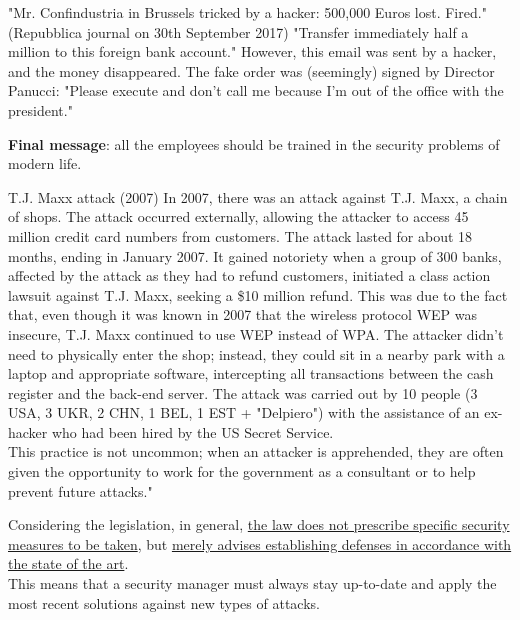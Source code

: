 \begin{casehistory}{"Mr. Confindustria in Brussels tricked by a hacker: 500,000 Euros lost. Fired." (Repubblica journal on 30th September 2017)}
	"Transfer immediately half a million to this foreign bank account." However, this email was sent by a hacker, and the money disappeared. The fake order was (seemingly) signed by Director Panucci: "Please execute and don't call me because I'm out of the office with the president."
\end{casehistory}

\textbf{Final message}: all the employees should be trained in the security problems of modern life.


\begin{casehistory}{T.J. Maxx attack (2007)}
	In 2007, there was an attack against T.J. Maxx, a chain of shops. The attack occurred externally, allowing the attacker to access 45 million credit card numbers from customers. The attack lasted for about 18 months, ending in January 2007. It gained notoriety when a group of 300 banks, affected by the attack as they had to refund customers, initiated a class action lawsuit against T.J. Maxx, seeking a \$10 million refund. This was due to the fact that, even though it was known in 2007 that the wireless protocol WEP was insecure, T.J. Maxx continued to use WEP instead of WPA. The attacker didn't need to physically enter the shop; instead, they could sit in a nearby park with a laptop and appropriate software, intercepting all transactions between the cash register and the back-end server. The attack was carried out by 10 people (3 USA, 3 UKR, 2 CHN, 1 BEL, 1 EST + "Delpiero") with the assistance of an ex-hacker who had been hired by the US Secret Service.\\
	This practice is not uncommon; when an attacker is apprehended, they are often given the opportunity to work for the government as a consultant or to help prevent future attacks."
\end{casehistory}
Considering the legislation, in general, \ul{the law does not prescribe specific security measures to be taken}, but \ul{merely advises establishing defenses in accordance with the state of the art}.\\
This means that a security manager must always stay up-to-date and apply the most recent solutions against new types of attacks.


